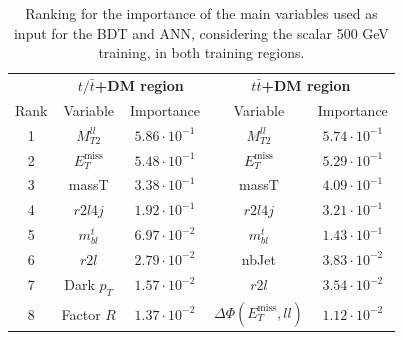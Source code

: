 \documentclass[a4paper, 10pt, openright]{report}
\begin{document}
\begin{table}
\begin{center}
\begin{tabular}{ c|c|c|c|c } 
 \hline
 & \multicolumn{2}{c}{\textbf{$t/\bar t$+DM region}} & \multicolumn{2}{c}{\textbf{$t \bar t$+DM region}} \\
 Rank & Variable & Importance & Variable & Importance \\
 \hline
 1 & $M_{T2}^{ll}$ & $5.86 \cdot 10^{-1}$ & $M_{T2}^{ll}$ & $5.74 \cdot 10^{-1}$ \\
 2 & $E_{T}^{\text{miss}}$ & $5.48 \cdot 10^{-1}$ & $E_{T}^{\text{miss}}$ & $5.29 \cdot 10^{-1}$ \\
 3 & massT & $3.38 \cdot 10^{-1}$ & massT & $4.09 \cdot 10^{-1}$ \\ 
 4 & $r2l4j$ & $1.92 \cdot 10^{-1}$ & $r2l4j$ & $3.21 \cdot 10^{-1}$ \\ 
 5 & $m_{bl}^t$ & $6.97 \cdot 10^{-2}$ & $m_{bl}^t$ & $1.43 \cdot 10^{-1}$ \\
 6 & $r2l$ & $2.79 \cdot 10^{-2}$ & nbJet & $3.83 \cdot 10^{-2}$ \\
 7 & Dark $p_T$ & $1.57 \cdot 10^{-2}$ & $r2l$ & $3.54 \cdot 10^{-2}$ \\
 8 & Factor $R$ & $1.37 \cdot 10^{-2}$ & $\Delta \Phi(E_{T}^{\text{miss}}, ll)$ & $1.12 \cdot 10^{-2}$ \\
\hline
\end{tabular}
\caption{Ranking for the importance of the main variables used as input for the \ac{BDT} and \ac{ANN}, considering the scalar 500 GeV training, in both training regions.}
\label{table:importance2}
\end{center}
\end{table}
\end{document}
